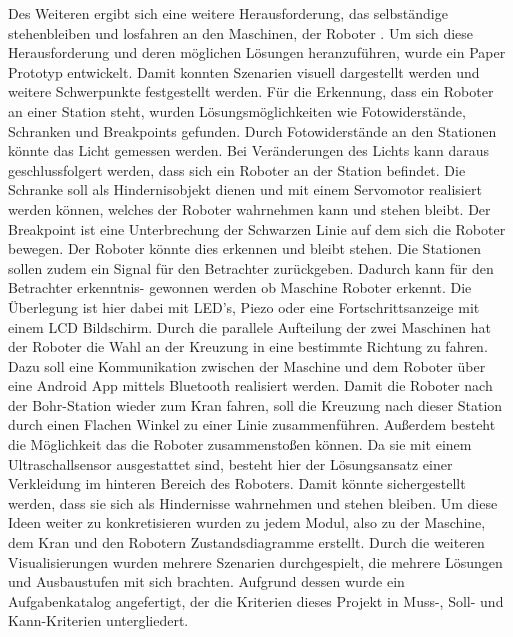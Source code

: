 Des Weiteren ergibt sich eine weitere Herausforderung, das selbständige stehenbleiben und losfahren an den Maschinen, der Roboter . Um sich diese Herausforderung und deren möglichen Lösungen heranzuführen, wurde ein Paper Prototyp entwickelt. Damit konnten Szenarien visuell dargestellt werden und weitere Schwerpunkte festgestellt werden. Für die Erkennung, dass ein Roboter an einer Station steht, wurden Lösungsmöglichkeiten wie Fotowiderstände, Schranken und Breakpoints gefunden. Durch Fotowiderstände an den Stationen könnte das Licht gemessen werden. Bei Veränderungen des Lichts kann daraus geschlussfolgert werden, dass sich ein Roboter an der Station befindet. Die Schranke soll als Hindernisobjekt dienen und mit einem Servomotor realisiert werden können, welches der Roboter wahrnehmen kann und stehen bleibt. Der Breakpoint ist eine Unterbrechung der Schwarzen Linie auf dem sich die Roboter bewegen. Der Roboter könnte dies erkennen und bleibt stehen. Die Stationen sollen zudem ein Signal für den Betrachter zurückgeben. Dadurch kann für den Betrachter erkenntnis- gewonnen werden ob Maschine Roboter erkennt. Die Überlegung ist hier dabei mit LED’s, Piezo oder eine Fortschrittsanzeige mit einem LCD Bildschirm.
Durch die parallele Aufteilung der zwei Maschinen hat der Roboter die Wahl an der Kreuzung in eine bestimmte Richtung zu fahren. Dazu soll eine Kommunikation zwischen der Maschine und dem Roboter über eine Android App mittels Bluetooth realisiert werden. Damit die Roboter nach der Bohr-Station wieder zum Kran fahren, soll die Kreuzung nach dieser Station durch einen Flachen Winkel zu einer Linie zusammenführen. Außerdem besteht die Möglichkeit das die Roboter zusammenstoßen können. Da sie mit einem Ultraschallsensor ausgestattet sind, besteht hier der Lösungsansatz einer Verkleidung im hinteren Bereich des Roboters. Damit könnte sichergestellt werden, dass sie sich als Hindernisse wahrnehmen und stehen bleiben.
Um diese Ideen weiter zu konkretisieren wurden zu jedem Modul, also zu der Maschine, dem Kran und den Robotern Zustandsdiagramme erstellt.
Durch die weiteren Visualisierungen wurden mehrere Szenarien durchgespielt, die mehrere Lösungen und Ausbaustufen mit sich brachten. Aufgrund dessen wurde ein Aufgabenkatalog angefertigt, der die Kriterien dieses Projekt in Muss-, Soll- und Kann-Kriterien untergliedert.
